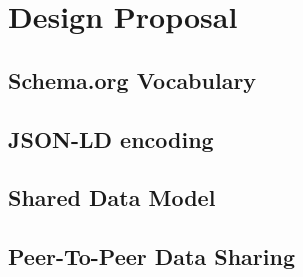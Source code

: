 
\section{Design Proposal}
\label{sec:design_proposal}

\subsection{Schema.org Vocabulary}
\label{subsec:schema_org_vocab}


\subsection{JSON-LD encoding}
\label{subsec:json_ld_enc}


\subsection{Shared Data Model}
\label{subsec:data_model}


\subsection{Peer-To-Peer Data Sharing}
\label{subsec:p2p_data_sharing}


